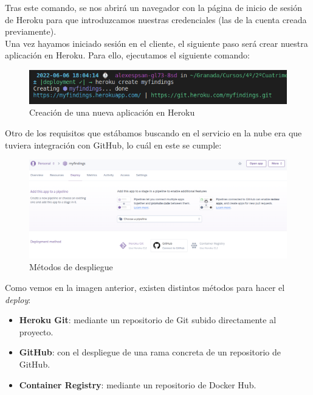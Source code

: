 Tras este comando, se nos abrirá un navegador con la página de inicio de sesión de Heroku
para que introduzcamos nuestras credenciales (las de la cuenta creada previamente).\\

Una vez hayamos iniciado sesión en el cliente, el siguiente paso será crear nuestra
aplicación en Heroku. Para ello, ejecutamos el siguiente comando:

    \begin{figure}[H]
        \centering
        \includegraphics[scale=0.55]{imagenes/heroku-create.png}
        \caption{Creación de una nueva aplicación en Heroku}
        \label{fig:heroku-create}
    \end{figure}

Otro de los requisitos que estábamos buscando en el servicio en la nube era que tuviera
integración con GitHub, lo cuál en este se cumple: \\

    \begin{figure}[H]
        \centering
        \includegraphics[scale=0.29]{imagenes/deployment-method.png}
        \caption{Métodos de despliegue}
        \label{fig:deployment-method}
    \end{figure}

\newpage Como vemos en la imagen anterior, existen distintos métodos para hacer el
\textit{deploy}:

    \begin{itemize}
        \item \textbf{Heroku Git}: mediante un repositorio de Git subido directamente
        al proyecto.
        \item \textbf{GitHub}: con el despliegue de una rama concreta de un repositorio
        de GitHub.
        \item \textbf{Container Registry}: mediante un repositorio de Docker Hub.
    \end{itemize}

